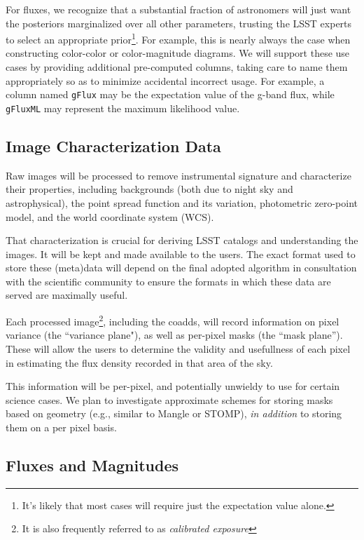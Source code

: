 \documentclass[12pt]{article}
\begin{document}
For fluxes, we recognize that a substantial fraction of astronomers will just want the posteriors marginalized over all other parameters, trusting the LSST experts to select an appropriate prior\footnote{It's likely that most cases will require just the expectation value alone.}. For example, this is nearly always the case when constructing color-color or color-magnitude diagrams. We will support these use cases by providing additional pre-computed columns, taking care to name them appropriately so as to minimize accidental incorrect usage. For example, a column named \texttt{gFlux} may be the expectation value of the g-band flux, while \texttt{gFluxML} may represent the maximum likelihood value.

\subsection{Image Characterization Data}

Raw images will be processed to remove instrumental signature and characterize their properties, including backgrounds (both due to night sky and astrophysical), the point spread function and its variation, photometric zero-point model, and the world coordinate system (WCS).

That characterization is crucial for deriving LSST catalogs and understanding the images. It will be kept and made available to the users. The exact format used to store these (meta)data will depend on the final adopted algorithm in consultation with the scientific community to ensure the formats in which these data are served are maximally useful.

Each processed image\footnote{It is also frequently referred to as {\em calibrated exposure}}, including the coadds, will record information on pixel variance (the ``variance plane"), as well as per-pixel masks (the ``mask plane''). These will allow the users to determine the validity and usefullness of each pixel in estimating the flux density recorded in that area of the sky.

This information will be per-pixel, and potentially unwieldy to use for certain science cases. We plan to investigate approximate schemes for storing masks based on geometry (e.g., similar to Mangle or STOMP), {\em in addition} to storing them on a per pixel basis.

\subsection{Fluxes and Magnitudes}
\label{sec:fluxes}
\end{document}
